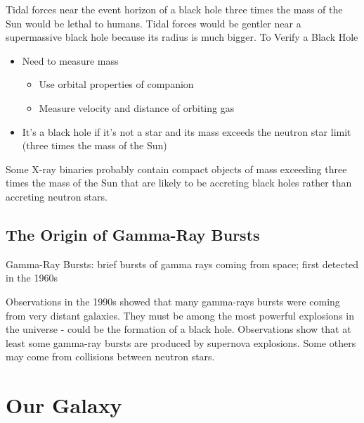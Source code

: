 \documentclass[12pt]{article}
\begin{document}
Tidal forces near the event horizon of a black hole three times the mass of the Sun would be lethal to humans. Tidal forces would be gentler near a supermassive black hole because its radius is much bigger. \newpage
To Verify a Black Hole \begin{itemize} 
\item Need to measure mass \begin{itemize} 
\item Use orbital properties of companion 
\item Measure velocity and distance of orbiting gas \end{itemize} 
\item It's a black hole if it's not a star and its mass exceeds the neutron star limit (three times the mass of the Sun) \end{itemize} 
Some X-ray binaries probably contain compact objects of mass exceeding three times the mass of the Sun that are likely to be accreting black holes rather than accreting neutron stars. 

\subsection{The Origin of Gamma-Ray Bursts}
\begin{definition} Gamma-Ray Bursts: brief bursts of gamma rays coming from space; first detected in the 1960s \end{definition} 
Observations in the 1990s showed that many gamma-rays bursts were coming from very distant galaxies. They must be among the most powerful explosions in the universe - could be the formation of a black hole. Observations show that at least some gamma-ray bursts are produced by supernova explosions. Some others may come from collisions between neutron stars.  

\section{Our Galaxy}
\end{document}
